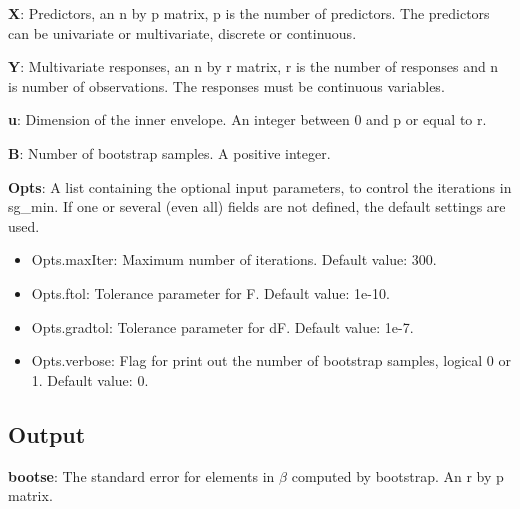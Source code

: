 \documentclass[a4paper,11pt,openany]{memoir}
\begin{document}
\begin{par}
\textbf{X}: Predictors, an n by p matrix, p is the number of predictors.  The predictors can be univariate or multivariate, discrete or continuous.
\end{par} \vspace{1em}
\begin{par}
\textbf{Y}: Multivariate responses, an n by r matrix, r is the number of responses and n is number of observations.  The responses must be continuous variables.
\end{par} \vspace{1em}
\begin{par}
\textbf{u}: Dimension of the inner envelope. An integer between 0 and p or equal to r.
\end{par} \vspace{1em}
\begin{par}
\textbf{B}: Number of bootstrap samples.  A positive integer.
\end{par} \vspace{1em}
\begin{par}
\textbf{Opts}: A list containing the optional input parameters, to control the iterations in sg\_min. If one or several (even all) fields are not defined, the default settings are used.
\end{par} \vspace{1em}
\begin{itemize}
\setlength{\itemsep}{-1ex}
   \item Opts.maxIter: Maximum number of iterations.  Default value: 300.
   \item Opts.ftol: Tolerance parameter for F.  Default value: 1e-10.
   \item Opts.gradtol: Tolerance parameter for dF.  Default value: 1e-7.
   \item Opts.verbose: Flag for print out the number of bootstrap samples, logical 0 or 1. Default value: 0.
\end{itemize}


\subsection*{Output}

\begin{par}
\textbf{bootse}: The standard error for elements in $\beta$ computed by bootstrap.  An r by p matrix.
\end{par} \vspace{1em}
\end{document}
